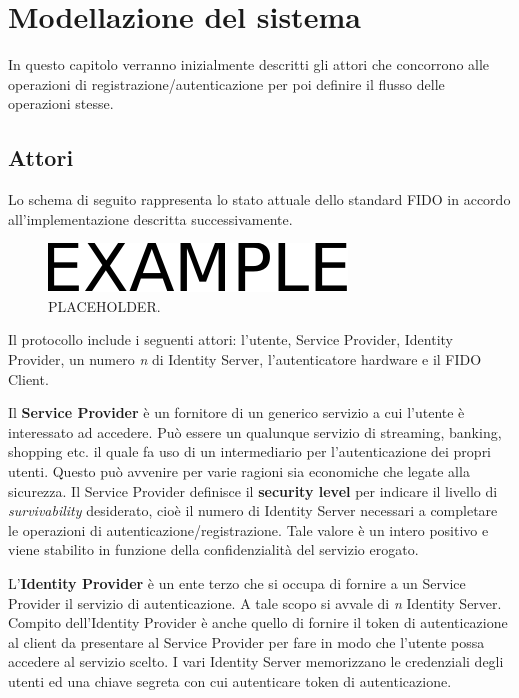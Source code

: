 \chapter{Modellazione del sistema}
\label{modellazione}

In questo capitolo verranno inizialmente descritti gli attori che concorrono alle operazioni di registrazione/autenticazione per poi definire il flusso delle operazioni stesse.

\section{Attori}
\label{attori}

Lo schema di seguito rappresenta lo stato attuale dello standard FIDO in accordo all'implementazione descritta successivamente.
\begin{figure}[htb]
	\centering
	\includegraphics[width=.4\columnwidth]{figures/example.pdf}
	\caption{PLACEHOLDER.}
	\label{fig:esempio}
\end{figure}

Il protocollo include i seguenti attori: l'utente, Service Provider, Identity Provider, un numero \emph{n} di Identity Server, l'autenticatore hardware e il FIDO Client. 

Il \textbf{Service Provider} è un fornitore di un generico servizio a cui l'utente è interessato ad accedere. Può essere un qualunque servizio di streaming, banking, shopping etc. il quale fa uso di un intermediario per l'autenticazione dei propri utenti. Questo può avvenire per varie ragioni sia economiche che legate alla sicurezza. 
Il Service Provider definisce il \textbf{security level} per indicare il livello di \emph{survivability} desiderato, cioè il numero di Identity Server necessari a completare le operazioni di autenticazione/registrazione. Tale valore è un intero positivo e viene stabilito in funzione della confidenzialità del servizio erogato.

L'\textbf{Identity Provider} è un ente terzo che si occupa di fornire a un Service Provider il servizio di autenticazione. A tale scopo si avvale di \emph{n} Identity Server.
Compito dell'Identity Provider è anche quello di fornire il token di autenticazione al client da presentare al Service Provider per fare in modo che l'utente possa accedere al servizio scelto.
I vari Identity Server memorizzano le credenziali degli utenti ed una chiave segreta con cui autenticare token di autenticazione.

